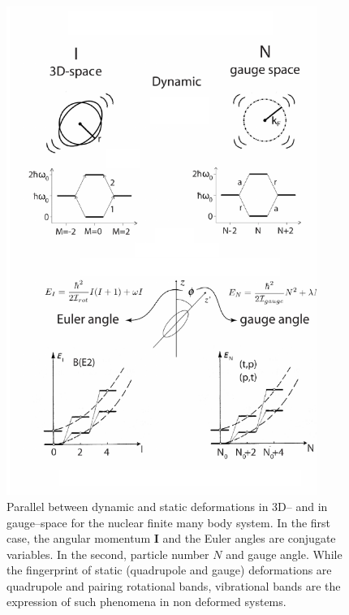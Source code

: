 \begin{figure}
	\centerline{\includegraphics*[width=0.9\textwidth,angle=0]{nutshell/figs/fig1D1_v2.pdf}}
	\caption{Parallel between dynamic and static deformations in 3D-- and in gauge--space for the nuclear finite many body system. In the first case, the angular momentum $\mathbf{I}$ and the Euler angles are conjugate variables. In the second, particle number $N$ and gauge angle. While the fingerprint of static (quadrupole and gauge) deformations are quadrupole and pairing rotational bands, vibrational bands are the expression of such phenomena in non deformed systems.}\label{fig1D1}
\end{figure}

